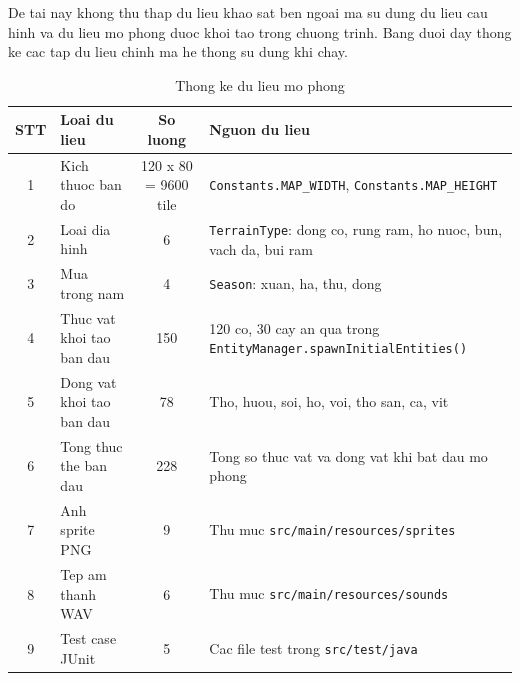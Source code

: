 \documentclass[12pt,a4paper]{article}
\begin{document}
De tai nay khong thu thap du lieu khao sat ben ngoai ma su dung du lieu cau hinh va du lieu mo phong duoc khoi tao trong chuong trinh. Bang duoi day thong ke cac tap du lieu chinh ma he thong su dung khi chay.

\begin{table}[H]
    \centering
    \caption{Thong ke du lieu mo phong}
    \begin{tabular}{|c|p{5cm}|c|p{5cm}|}
        \hline
        \textbf{STT} & \textbf{Loai du lieu} & \textbf{So luong} & \textbf{Nguon du lieu} \\
        \hline
        1 & Kich thuoc ban do & 120 x 80 = 9600 tile & \texttt{Constants.MAP\_WIDTH}, \texttt{Constants.MAP\_HEIGHT} \\
        \hline
        2 & Loai dia hinh & 6 & \texttt{TerrainType}: dong co, rung ram, ho nuoc, bun, vach da, bui ram \\
        \hline
        3 & Mua trong nam & 4 & \texttt{Season}: xuan, ha, thu, dong \\
        \hline
        4 & Thuc vat khoi tao ban dau & 150 & 120 co, 30 cay an qua trong \texttt{EntityManager.spawnInitialEntities()} \\
        \hline
        5 & Dong vat khoi tao ban dau & 78 & Tho, huou, soi, ho, voi, tho san, ca, vit \\
        \hline
        6 & Tong thuc the ban dau & 228 & Tong so thuc vat va dong vat khi bat dau mo phong \\
        \hline
        7 & Anh sprite PNG & 9 & Thu muc \texttt{src/main/resources/sprites} \\
        \hline
        8 & Tep am thanh WAV & 6 & Thu muc \texttt{src/main/resources/sounds} \\
        \hline
        9 & Test case JUnit & 5 & Cac file test trong \texttt{src/test/java} \\
        \hline
    \end{tabular}
\end{table}
\end{document}
